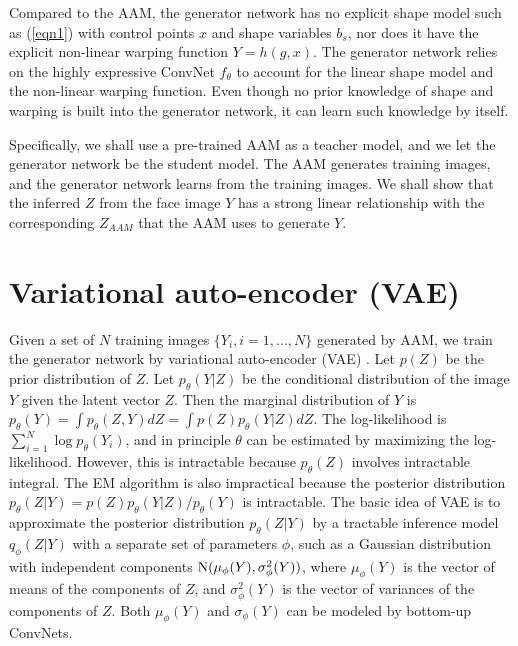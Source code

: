 \documentclass{article}
\begin{document}
Compared to the AAM, the generator network has no explicit shape model such as (\ref{eqn1}) with control points $x$ and shape variables $b_s$, nor does it have the explicit non-linear  warping function $Y = h(g, x)$. The generator network relies on the highly expressive ConvNet $f_\theta$ to account for the linear shape model and the non-linear warping function. Even though no prior knowledge of shape and warping is built into the generator network, it can learn such knowledge by itself.

Specifically, we shall use a pre-trained AAM as a teacher model, and we let the generator network be the student model. The AAM generates training images, and the generator network learns from the training images. We shall show that the inferred $Z$ from the face image $Y$ has a strong linear relationship with the corresponding $Z_{AAM}$ that the AAM uses to generate $Y$.

\section{Variational auto-encoder (VAE)}

Given a set of $N$ training images $\{Y_i, i = 1, ..., N\}$  generated by AAM, we train the generator network by variational auto-encoder (VAE) \cite{KingmaCoRR13,RezendeICML2014,salimans2015markov}. Let $p(Z)$ be the prior distribution of $Z$. Let $p_\theta(Y|Z)$ be the conditional distribution of the image $Y$ given the latent vector $Z$. Then the marginal distribution of $Y$ is $p_\theta(Y) = \int p_\theta(Z, Y) dZ = \int p(Z) p_\theta(Y|Z) dZ$. The log-likelihood is $\sum_{i=1}^{N} \log p_\theta(Y_i)$, and in principle $\theta$ can be estimated by maximizing the log-likelihood. However, this is intractable because $p_\theta(Z)$ involves intractable integral. The EM algorithm \cite{dempster1977maximum} is also impractical because the posterior distribution $p_\theta(Z|Y) = p(Z) p_\theta(Y|Z)/p_\theta(Y)$ is intractable. The basic idea of VAE is to approximate the posterior distribution $p_\theta(Z|Y)$ by a tractable inference model $q_\phi(Z|Y)$ with a separate set of parameters $\phi$, such as a Gaussian distribution with independent components ${\rm N}(\mu_\phi(Y), \sigma^2_\phi(Y))$, where $\mu_\phi(Y)$ is the vector of means of the components of $Z$, and $\sigma^2_\phi(Y)$ is the vector of variances of the components of $Z$. Both $\mu_\phi(Y)$ and $\sigma_\phi(Y)$ can be modeled by bottom-up ConvNets.
\end{document}
